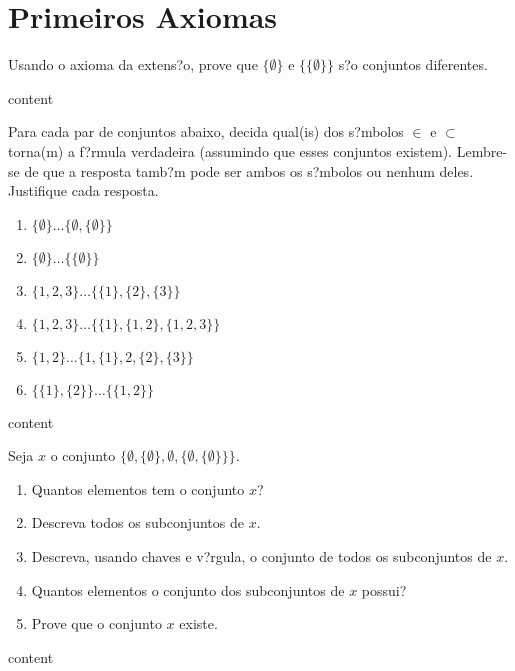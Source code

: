 \chapter{Primeiros Axiomas}

\setcounter{ex}{0}

\begin{exercicio}
	Usando o axioma da extens?o, prove que $\{\emptyset\}$ e $\{\{\emptyset\}\}$ s?o conjuntos diferentes.
\end{exercicio}
\begin{solucao}
	content
\end{solucao}

\begin{exercicio}
	Para cada par de conjuntos abaixo, decida qual(is) dos s?mbolos $\in$ e $\subset$ torna(m) a f?rmula verdadeira (assumindo que esses conjuntos existem). Lembre-se de que a resposta tamb?m pode ser ambos os s?mbolos ou nenhum deles. Justifique cada resposta.
	\begin{enumerate}[label=(\alph{*})]
		\item $\{\emptyset\}\ldots\{\emptyset,\{\emptyset\}\}$
		\item $\{\emptyset\}\ldots\{\{\emptyset\}\}$
		\item $\{1,2,3\}\ldots\{\{1\},\{2\},\{3\}\}$
		\item $\{1,2,3\}\ldots\{\{1\},\{1,2\},\{1,2,3\}\}$
		\item $\{1,2\}\ldots\{1,\{1\},2,\{2\},\{3\}\}$
		\item $\{\{1\},\{2\}\}\ldots\{\{1,2\}\}$
	\end{enumerate}
\end{exercicio}
\begin{solucao}
	content
\end{solucao}

\begin{exercicio}
	Seja $x$ o conjunto $\{\emptyset,\{\emptyset\},\emptyset,\{\emptyset,\{\emptyset\}\}\}$.
	\begin{enumerate}[label=(\alph{*})]
		\item Quantos elementos tem o conjunto $x$?
		\item Descreva todos os subconjuntos de $x$.
		\item Descreva, usando chaves e v?rgula, o conjunto de todos os subconjuntos de $x$.
		\item Quantos elementos o conjunto dos subconjuntos de $x$ possui?
		\item Prove que o conjunto $x$ existe.
	\end{enumerate}
\end{exercicio}
\begin{solucao}
	content
\end{solucao}

